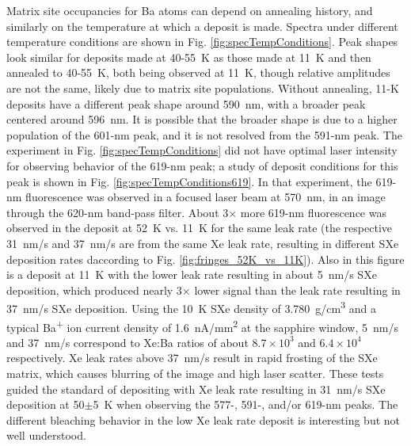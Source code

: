 Matrix site occupancies for Ba atoms can depend on annealing history, and similarly on the temperature at which a deposit is made.  Spectra under different temperature conditions are shown in Fig. \ref{fig:specTempConditions}.  Peak shapes look similar for deposits made at 40-55~K as those made at 11~K and then annealed to 40-55~K, both being observed at 11~K, though relative amplitudes are not the same, likely due to matrix site populations.  Without annealing, 11-K deposits have a different peak shape around 590~nm, with a broader peak centered around 596~nm.  It is possible that the broader shape is due to a higher population of the 601-nm peak, and it is not resolved from the 591-nm peak.  The experiment in Fig. \ref{fig:specTempConditions} did not have optimal laser intensity for observing behavior of the 619-nm peak; a study of deposit conditions for this peak is shown in Fig. \ref{fig:specTempConditions619}.  In that experiment, the 619-nm fluorescence was observed in a focused laser beam at 570~nm, in an image through the 620-nm band-pass filter.  About 3$\times$ more 619-nm fluorescence was observed in the deposit at 52~K vs. 11~K for the same leak rate (the respective 31~nm/s and 37~nm/s are from the same Xe leak rate, resulting in different SXe deposition rates daccording to Fig. \ref{fig:fringes_52K_vs_11K}).  Also in this figure is a deposit at 11~K with the lower leak rate resulting in about 5~nm/s SXe deposition, which produced nearly 3$\times$ lower signal than the leak rate resulting in 37~nm/s SXe deposition.  Using the 10~K SXe density of 3.780~g/cm\textsuperscript{3} \cite{SXeDensity} and a typical Ba\textsuperscript{+} ion current density of 1.6~nA/mm\textsuperscript{2} at the sapphire window, 5~nm/s and 37~nm/s correspond to Xe:Ba ratios of about $8.7 \times 10^{3}$ and $6.4 \times 10^{4}$ respectively.  Xe leak rates above 37~nm/s result in rapid frosting of the SXe matrix, which causes blurring of the image and high laser scatter.  These tests guided the standard of depositing with Xe leak rate resulting in 31~nm/s SXe deposition at 50$\pm$5~K when observing the 577-, 591-, and/or 619-nm peaks.  The different bleaching behavior in the low Xe leak rate deposit is interesting but not well understood.




